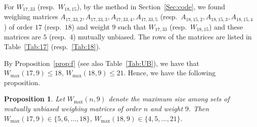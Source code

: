 \documentclass[12pt]{article}
\newtheorem{prop}[thm]{Proposition}
\theoremstyle{remark}
\begin{document}
% 

For $W_{17,33}$ (resp.\ $W_{18,15}$),
by the method in Section~\ref{Sec:code},
we found weighing matrices 
$A_{17,33,2},A_{17,33,3},A_{17,33,4},A_{17,33,5}$ 
(resp.\ $A_{18,15,2},A_{18,15,3},A_{18,15,4}$)
of order $17$ (resp.\ $18$) and weight $9$ 
such that $W_{17,33}$ (resp.\ $W_{18,15}$) and these matrices are $5$ 
(resp.\ $4$) mutually unbiased.
The rows of the matrices are listed in Table~\ref{Tab:17} (resp.\ \ref{Tab:18}).



By Proposition~\ref{prop:f} (see also Table~\ref{Tab:UB}), 
we have that $W_{\max}(17,9) \le 18$, $W_{\max}(18,9) \le 21$.
Hence, we have the following proposition.


\begin{prop}\label{prop:1718}
Let $W_{\max}(n,9)$ denote 
the maximum size among sets of mutually
unbiased weighing matrices of order $n$ and weight $9$.
Then $W_{\max}(17,9) \in \{5,6,\ldots,18\}$, 
$W_{\max}(18,9) \in \{4,5,\ldots,21\}$.
\end{prop}
\end{document}
